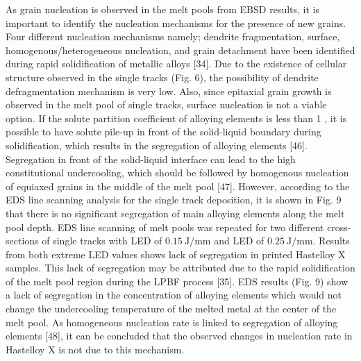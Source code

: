 \documentclass[10pt]{article}
\begin{document}
As grain nucleation is observed in the melt pools from EBSD results, it is important to identify the nucleation mechanisms for the presence of new grains. Four different nucleation mechanisms namely; dendrite fragmentation, surface, homogenous/heterogeneous nucleation, and grain detachment have been identified during rapid solidification of metallic alloys [34]. Due to the existence of cellular structure observed in the single tracks (Fig. 6), the possibility of dendrite defragmentation mechanism is very low. Also, since epitaxial grain growth is observed in the melt pool of single tracks, surface nucleation is not a viable option. If the solute partition coefficient of alloying elements is less than 1 , it is possible to have solute pile-up in front of the solid-liquid boundary during solidification, which results in the segregation of alloying elements [46]. Segregation in front of the solid-liquid interface can lead to the high constitutional undercooling, which should be followed by homogenous nucleation of equiaxed grains in the middle of the melt pool [47]. However, according to the EDS line scanning analysis for the single track deposition, it is shown in Fig. 9 that there is no significant segregation of main alloying elements along the melt pool depth. EDS line scanning of melt pools was repeated for two different cross-sections of single tracks with LED of $0.15 \mathrm{~J} / \mathrm{mm}$ and LED of $0.25 \mathrm{~J} / \mathrm{mm}$. Results from both extreme LED values shows lack of segregation in printed Hastelloy X samples. This lack of segregation may be attributed due to the rapid solidification of the melt pool region during the LPBF process [35]. EDS results (Fig. 9) show a lack of segregation in the concentration of alloying elements which would not change the undercooling temperature of the melted metal at the center of the melt pool. As homogeneous nucleation rate is linked to segregation of alloying elements [48], it can be concluded that the observed changes in nucleation rate in Hastelloy $\mathrm{X}$ is not due to this mechanism.
\end{document}
